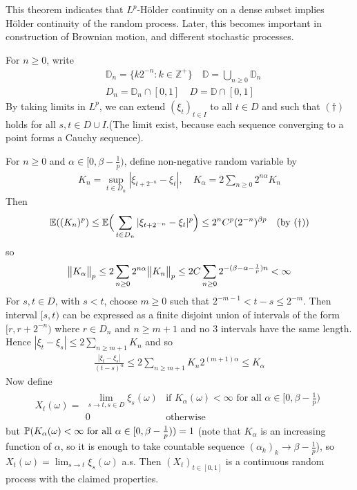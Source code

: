 \documentclass[12pt,a4paper]{report}
\newenvironment{proof}
{\begin{changemargin}{1cm}{0.5cm} 
	}%
	{\end{changemargin}
}
\begin{document}
This theorem indicates that $L^p$-H\"{o}lder continuity on a dense subset implies H\"{o}lder continuity of the random process. Later, this becomes important in construction of Brownian motion, and different stochastic processes.
\begin{proof}
\pf For $n \geq 0$, write
\begin{align*}
& \mathbb{D}_n = \{ k2^{-n}  : k \in \mathbb{Z}^+ \} \quad \mathbb{D}= \bigcup_{n\geq 0} \mathbb{D}_n \\
& D_n = \mathbb{D}_n \cap [0,1] \quad D = \mathbb{D} \cap [0,1]
\end{align*}
By taking limits in $L^p$, we can extend $(\xi_t)_{t\in I}$ to all $t\in D$ and such that $(\dagger)$ holds for all $s,t\in D\cup I$.(The limit exist, because each sequence converging to a point forms a Cauchy sequence).

\quad For $n \geq 0$ and $\alpha \in [0, \beta - \frac{1}{p})$, define non-negative random variable by
\begin{align*}
K_n = \sup_{t\in D_n} |\xi_{t+ 2^{-n}} - \xi_t|, \quad K_{\alpha} =2\sum_{n\geq 0} 2^{n\alpha} K_n
\end{align*}
Then
\begin{align*}
\mathbb{E}((K_n)^p) \leq \mathbb{E} \Big( \sum_{t\in D_n} |\xi_{t+{2^{-n}}} - \xi_t |^p \Big) \leq 2^n C^p (2^{-n})^{\beta p} \quad (\text{by } (\dagger))
\end{align*}
so
\begin{align*}
\bigl\lVert K_{\alpha}\bigr\rVert_{p} \leq 2 \sum_{n\geq 0} 2^{n\alpha} \bigl\lVert K_n\bigr\rVert_{p} \leq 2C \sum_{n\geq 0} 2^{-(\beta - \alpha - \frac{1}{p})n} < \infty
\end{align*}
For $s,t\in D$, with $s<t$, choose $m\geq 0$ such that $2^{-m-1} <t-s \leq 2^{-m}$. Then interval $[s,t)$ can be expressed as a finite disjoint union of intervals of the form $[r, r+ 2^{-n})$ where $r\in D_n$ and $n\geq m+1$ and no 3 intervals have the same length. Hence $|\xi_t - \xi_s | \leq 2\sum_{n\geq m+1} K_n$ and so 
\begin{align*}
\frac{|\xi_t - \xi_s|}{(t-s)^{\alpha}} \leq 2\sum_{n\geq m+1} K_n 2^{(m+1)\alpha} \leq K_{\alpha}
\end{align*}
Now define
\begin{align*}
X_t(\omega) = \begin{array}{ll}
\lim_{s\rightarrow t, s\in D} \xi_s (\omega)  & \text{if } K_{\alpha}(\omega) < \infty \text{ for all } \alpha \in [0,\beta -\frac{1}{p}) \\
0 & \text{otherwise}
\end{array}
\end{align*}
but $\mathbb{P}(K_{\alpha}(\omega) < \infty \text{ for all } \alpha \in [0,\beta -\frac{1}{p})) =1$ (note that $K_{\alpha}$ is an increasing function of $\alpha$, so it is enough to take countable sequence $(\alpha_k)_k\rightarrow \beta -\frac{1}{p}$), so $X_t(\omega) = \lim_{s\rightarrow t}\xi_s(\omega)$ a.s. Then $(X_t)_{t\in [0,1]}$ is a continuous random process with the claimed properties.

\eop
\end{proof}
\s
\end{document}

